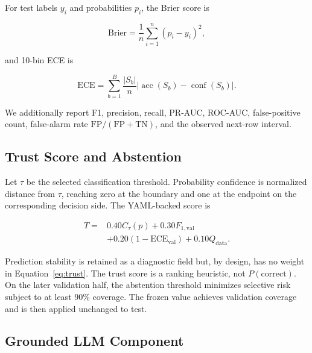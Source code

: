 \documentclass[10pt,conference]{IEEEtran}
\newcommand{\ece}{\mathrm{ECE}}
\begin{document}
\begin{table}[t]
\caption{Validation-selected calibration and thresholds}
\label{tab:cal}
\centering
\resizebox{\columnwidth}{!}{}
\end{table}

For test labels $y_i$ and probabilities $p_i$, the Brier score is

\begin{equation}
\mathrm{Brier}=\frac{1}{n}\sum_{i=1}^{n}(p_i-y_i)^2,
\end{equation}

and 10-bin ECE is

\begin{equation}
\ece=\sum_{b=1}^{B}\frac{|S_b|}{n}
\left|\operatorname{acc}(S_b)-\operatorname{conf}(S_b)\right|.
\end{equation}

We additionally report F1, precision, recall, PR-AUC, ROC-AUC, false-positive
count, false-alarm rate $\mathrm{FP}/(\mathrm{FP}+\mathrm{TN})$, and the
observed next-row interval.

\subsection{Trust Score and Abstention}

Let $\tau$ be the selected classification threshold.  Probability confidence
is normalized distance from $\tau$, reaching zero at the boundary and one at
the endpoint on the corresponding decision side.  The YAML-backed score is

\begin{align}
T={}&0.40C_{\tau}(p)+0.30F_{1,\mathrm{val}} \\
   &+0.20(1-\ece_{\mathrm{val}})+0.10Q_{\mathrm{data}}.
\label{eq:trust}
\end{align}

Prediction stability is retained as a diagnostic field but, by design, has no
weight in Equation~\ref{eq:trust}.  The trust score is a ranking heuristic,
not $P(\mathrm{correct})$.  On the later validation half, the abstention
threshold minimizes selective risk subject to at least 90\% coverage.  The
frozen value \TrustThreshold achieves \ValidationCoverage validation coverage and is then
applied unchanged to test.

\subsection{Grounded LLM Component}
\end{document}
